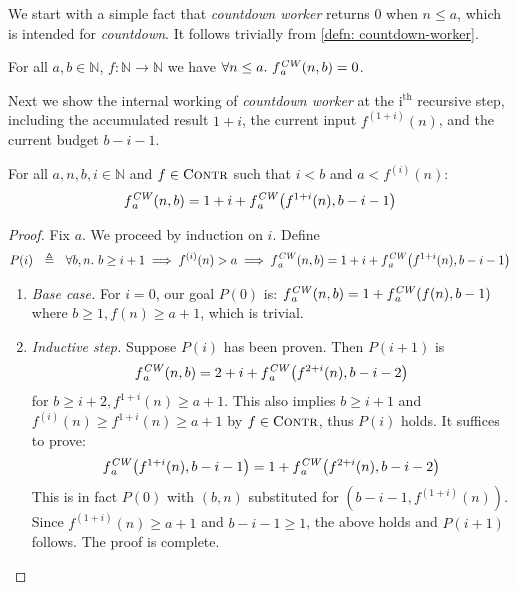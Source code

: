 We start with a simple fact that \emph{countdown worker} returns $0$ when $n\le a$, which is intended for \emph{countdown}. It follows trivially from \cref{defn: countdown-worker}.
\begin{lem} \label{lem: cdt-init}
	For all $a, b\in \mathbb{N}$, $f : \mathbb{N}\to \mathbb{N}$ we have $\forall n\le a.~\cdw{f}{a} (n, b) = 0$.
\end{lem}
Next we show the internal working of \emph{countdown worker} at the $\text{i}^\text{th}$ recursive step, including the accumulated result $1+i$, the current input $f^{(1+i)}(n)$, and the current budget $b-i-1$.
\begin{lem} \label{lem: cdt-intermediate}
	For all $a, n, b, i\in \mathbb{N}$ and $f \in \text{\scshape{Contr}}$ such that $i < b$ and $a < f^{(i)}(n)$:
	\begin{equation}  \label{eq: cdt-intermediate}
	\cdw{f}{a}(n, b) = 1 + i + \cdw{f}{a}\left(f^{1+i}(n), b - i - 1\right)
	\end{equation}
\end{lem}
\begin{proof}
	Fix $a$. We proceed by induction on $i$. Define
	\begin{equation*}
	P(i) ~~ \triangleq ~~ \forall b, n.~ b\ge i+1 \implies f^{(i)}(n) > a \implies \cdw{f}{a}(n, b) = 1 + i + \cdw{f}{a}\left(f^{1+i}(n), b - i - 1\right)
	\end{equation*}
	\begin{enumerate}[leftmargin=*]
		\item \textit{Base case.} For $i = 0$, our goal $P(0)$ is:
		$\cdw{f}{a}(n, b) = 1 + \cdw{f}{a}\left(f(n), b - 1\right)$
		where $b \ge 1, f(n)\ge a+1$, which is trivial.
		\item \textit{Inductive step.} Suppose $P(i)$ has been proven. Then $P(i+1)$ is
		\begin{equation*}
		\cdw{f}{a}(n, b) = 2 + i + \cdw{f}{a}\left( f^{2+i}(n), b - i - 2 \right)
		\end{equation*}
		for $b \ge i+2, f^{1+i}(n) \ge a+1$. This also implies $b\ge i+1$ and $\displaystyle f^{(i)}(n) \ge f^{1+i}(n)\ge a+1$ by $f\in \text{\scshape{Contr}}$, thus $P(i)$ holds. It suffices to prove:
		\begin{equation*}
		\cdw{f}{a}\left(f^{1+i}(n), b-i-1\right) = 1 + \cdw{f}{a}\left( f^{2+i}(n), b-i-2 \right)
		\end{equation*}
		This is in fact $P(0)$ with $(b, n)$ substituted for $\left(b-i-1, f^{(1+i)}(n)\right)$. Since $f^{(1+i)}(n) \ge a+1$ and $b-i-1\ge 1$, the above holds and $P(i+1)$ follows. The proof is complete. \vspace*{-1.85em}
	\end{enumerate}
\end{proof}
